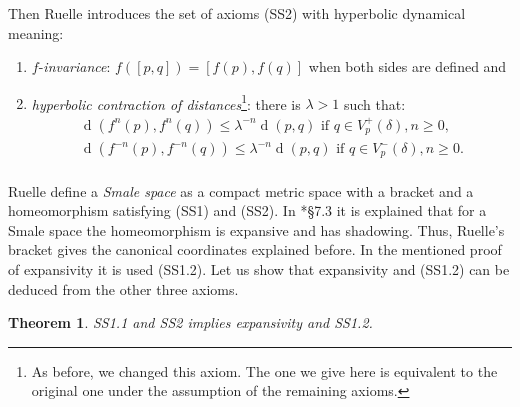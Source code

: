 \documentclass[12pt]{amsart}
\theoremstyle{plain}
\newtheorem{thm}{Theorem}[section]
\theoremstyle{definition}
\theoremstyle{remark}
\DeclareMathOperator{\dist}{d}
\newcommand{\rojo}[1]{\textcolor{red}{#1}}
\begin{document}
Then Ruelle introduces the set of axioms (SS2) with hyperbolic dynamical meaning:
\begin{enumerate}
	\item [(SS2.1)] $f$-\textit{invariance}: $f([p,q])=[f(p),f(q)]$ when both sides are defined and
	\item [(SS2.2)] \textit{hyperbolic contraction of distances}\footnote{As before, we changed this axiom. The one we give here is equivalent to the original one under the assumption of the remaining axioms.}:
	there is $\lambda>1$ such that:
	\begin{align*}
		\dist(f^n(p),f^n(q))\leq\lambda^{-n}\dist(p,q)  \text{ if }  q\in V^+_p(\delta), n\geq0,\\
		\dist(f^{-n}(p),f^{-n}(q))\leq\lambda^{-n}\dist(p,q)  \text{ if }  q\in V^-_p(\delta), n\geq 0.\\
	\end{align*}
\end{enumerate}

Ruelle define a \textit{Smale space} as a compact metric space with a bracket and a homeomorphism satisfying (SS1) and (SS2). In \cite{Ruelle}*{\S 7.3} it is explained that for a Smale space the homeomorphism is expansive and has shadowing. Thus, Ruelle's bracket gives the canonical coordinates explained before.
In the mentioned proof of expansivity it is used (SS1.2). Let us show that expansivity and (SS1.2) can be deduced from the other three axioms.

\begin{thm}
	\label{thmRuelleBExp}
	SS1.1 and SS2 implies expansivity and SS1.2.
\end{thm}
\end{document}
